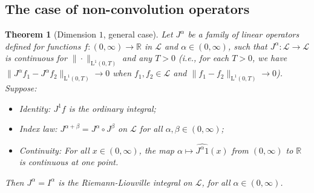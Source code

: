 \documentclass[12pt,reqno]{amsart}
\theoremstyle{plain}
\newtheorem{theorem}{Theorem}[section] %
\numberwithin{equation}{section} %
\begin{document}
\subsection{The case of non-convolution operators} \label{subs_no_lin1}

\begin{theorem}[Dimension $1$, general case] \label{th1_cor33}
Let $J^\alpha$ be a family of linear operators defined for functions $f:(0,\infty)\rightarrow\mathbb{R}$ in $\mathcal{L}$ and $\alpha\in (0,\infty)$, such that $J^\alpha:\mathcal{L}\rightarrow \mathcal{L}$ is continuous for $\|\cdot\|_{\mathrm{L}^1(0,T)}$ and any $T>0$ (i.e., for each $T>0$, we have $\|J^\alpha f_1-J^\alpha f_2\|_{\mathrm{L}^1(0,T)}\rightarrow 0$ when $f_1,f_2\in\mathcal{L}$ and $\|f_1-f_2\|_{\mathrm{L}^1(0,T)}\rightarrow0$). Suppose: 
\begin{itemize}
\item Identity: $J^1 f$ is the ordinary integral;
\item Index law: $J^{\alpha+\beta}=J^\alpha\circ J^\beta$ on $\mathcal{L}$ for all $\alpha,\beta\in (0,\infty)$; 
\item Continuity: For all $x\in (0,\infty)$, the map $\alpha\mapsto \widehat{J^{\alpha}1}(x)$ from $(0,\infty)$ to $\mathbb{R}$ is continuous at one point.
\end{itemize}
Then $J^\alpha=I^\alpha$ is the Riemann-Liouville integral on $\mathcal{L}$, for all $\alpha\in (0,\infty)$.
\end{theorem}
\end{document}
